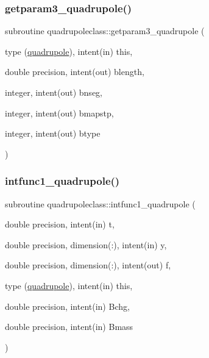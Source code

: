 \mbox{\label{namespacequadrupoleclass_ae5c8a42ae81e07dcb9eb91681d28f04e}} 
\subsubsection{\texorpdfstring{getparam3\_quadrupole()}{getparam3\_quadrupole()}}
{\footnotesize\ttfamily subroutine quadrupoleclass\+::getparam3\+\_\+quadrupole (\begin{DoxyParamCaption}\item[{type (\mbox{\hyperlink{namespacequadrupoleclass_structquadrupoleclass_1_1quadrupole}{quadrupole}}), intent(in)}]{this,  }\item[{double precision, intent(out)}]{blength,  }\item[{integer, intent(out)}]{bnseg,  }\item[{integer, intent(out)}]{bmapstp,  }\item[{integer, intent(out)}]{btype }\end{DoxyParamCaption})}

\mbox{\label{namespacequadrupoleclass_a3cbe01df676294387d1293468425aa70}} 
\subsubsection{\texorpdfstring{intfunc1\_quadrupole()}{intfunc1\_quadrupole()}}
{\footnotesize\ttfamily subroutine quadrupoleclass\+::intfunc1\+\_\+quadrupole (\begin{DoxyParamCaption}\item[{double precision, intent(in)}]{t,  }\item[{double precision, dimension(\+:), intent(in)}]{y,  }\item[{double precision, dimension(\+:), intent(out)}]{f,  }\item[{type (\mbox{\hyperlink{namespacequadrupoleclass_structquadrupoleclass_1_1quadrupole}{quadrupole}}), intent(in)}]{this,  }\item[{double precision, intent(in)}]{Bchg,  }\item[{double precision, intent(in)}]{Bmass }\end{DoxyParamCaption})}

